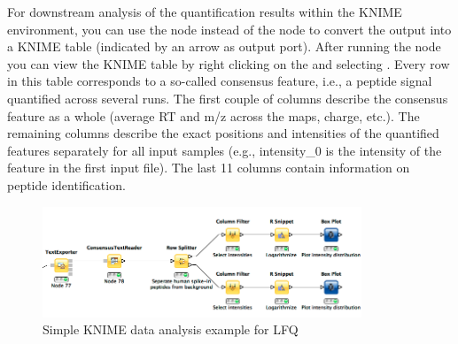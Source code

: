 For downstream analysis of the quantification results within the KNIME environment, you can use the  node  instead of the  node to convert the output into a KNIME table (indicated by an arrow as output port). 
After running the node you can view the KNIME table by right clicking on the  and selecting .
Every row in this table corresponds to a so-called consensus feature, i.e., a peptide signal quantified across several runs. The first couple of columns describe the consensus feature as a whole (average RT and m/z across the maps, charge, etc.). The remaining columns describe the exact positions and intensities of the quantified features separately for all input samples (e.g., intensity\_0 is the intensity of the feature in the first input file). The last 11 columns contain information on peptide identification.

\begin{figure}[htbp]
  \centering
  \includegraphics[width=0.85\textwidth]{graphics/labelfree/data_analysis}
  \caption{Simple KNIME data analysis example for LFQ}
  \label{fig:lfq_data_analysis}
\end{figure}

